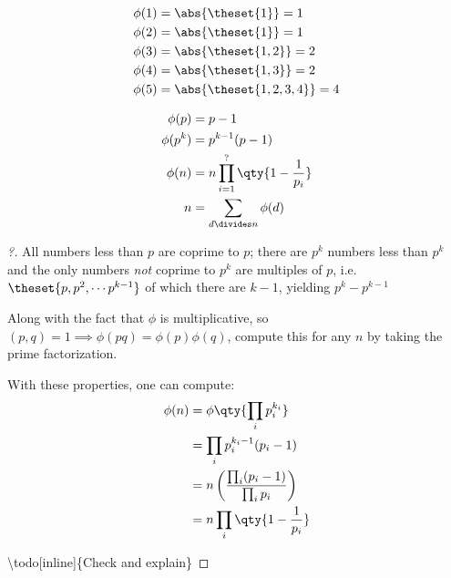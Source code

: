 \begin{example}[?]

\begin{align*}
\phi(1) & = \abs{\theset{1}} = 1 \\
\phi(2) & = \abs{\theset{1}} = 1 \\
\phi(3) & = \abs{\theset{1,2}} = 2 \\
\phi(4) & = \abs{\theset{1,3}} = 2 \\
\phi(5) & = \abs{\theset{1,2,3,4}} = 4
\end{align*}

\end{example}

\begin{proposition}

\begin{align*}
\phi(p)   & = p-1 \\
\phi(p^k) & = p^{k-1}(p-1) \\
\phi(n) &= n\prod_{i=1}^{?} \qty{1 - {1\over p_i}} \\
n &= \sum_{\tiny d\divides n} \phi(d) 
\end{align*}

\end{proposition}

\begin{proof}[?]

All numbers less than \(p\) are coprime to \(p\); there are \(p^k\)
numbers less than \(p^k\) and the only numbers \emph{not} coprime to
\(p^k\) are multiples of \(p\), i.e.~\(\theset{p, p^2, \cdots p^{k-1}}\)
of which there are \(k-1\), yielding \(p^k - p^{k-1}\)

Along with the fact that \(\phi\) is multiplicative, so
\((p,q) = 1 \implies \phi(pq) = \phi(p)\phi(q)\), compute this for any
\(n\) by taking the prime factorization.

With these properties, one can compute:
\begin{align*}
\phi(n) 
&= \phi\qty{ \prod_i p_i^{k_i}} \\
&= \prod_i p_i^{k_i-1}(p_i-1) \\ 
&= n \left(\frac{\prod_i (p_i-1)}{\prod_i p_i}\right) \\ 
&= n\prod_i \qty{ 1 - \frac{1}{p_i}}
\end{align*}

\textbackslash todo{[}inline{]}\{Check and explain\}

\end{proof}


